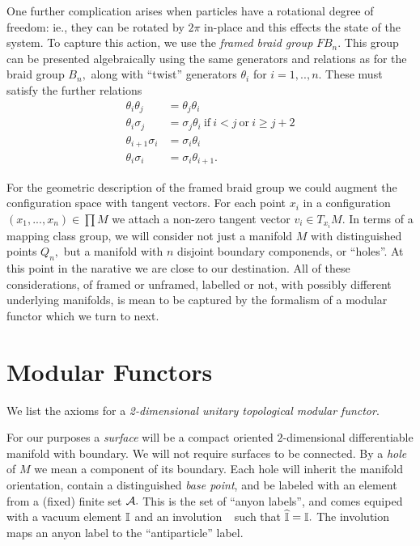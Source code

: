 \documentclass[aps, prl, letterpaper, twocolumn, superscriptaddress, notitlepage, 10pt]{revtex4-1}
\begin{document}
One further complication arises when particles have a rotational
degree of freedom: ie., they can be rotated by $2\pi$ in-place and
this effects the state of the system.
To capture this action, we use the \emph{framed braid group} $FB_n.$
This group can be presented algebraically using the same generators
and relations as for the braid group $B_n,$ along with
``twist'' generators $\theta_i$ for $i=1,..,n.$
These must satisfy the further relations
\begin{align*}
    \theta_i \theta_j &= \theta_j \theta_i \\
    \theta_i\sigma_j &= \sigma_j\theta_i 
    \ \mbox{if}\ i<j \ \mbox{or}\ i\ge j+2\\
    \theta_{i+1}\sigma_i &= \sigma_i\theta_i \\
    \theta_{i}\sigma_i &= \sigma_i\theta_{i+1}.
\end{align*}

For the geometric description of the framed braid
group we could augment the configuration space
with tangent vectors. For each point $x_i$
in a configuration $(x_1,...,x_n)\in \prod M$ we
attach a non-zero tangent vector $v_i\in T_{x_i}M.$
In terms of a mapping class group, we will
consider not just a manifold $M$ with
distinguished points $Q_n,$ but a manifold with $n$ disjoint
boundary componends, or ``holes''.
At this point in the narative we are close to our destination.
All of these considerations, of framed or unframed, labelled or
not, with possibly different underlying manifolds, is mean to
be captured by the formalism of a modular functor which we turn to next.


%
%

\section{Modular Functors}

We list the axioms for a 
\emph{2-dimensional unitary topological modular functor}.

For our purposes a \emph{surface} will be a compact
oriented $2$-dimensional differentiable manifold with boundary. %
We will not require surfaces to be connected.
By a \emph{hole} of $M$ we mean a component of its boundary. %
Each hole will inherit the manifold orientation,
contain a distinguished \emph{base point},
and be labeled with
an element from a (fixed) finite set $\mathcal{A}.$
This is the set of ``anyon labels'', and comes
equiped with a vacuum element $\mathbb{I}$ 
and an involution $\ \widehat{}\ $ such that $\widehat{\mathbb{I}}=\mathbb{I}.$
The involution maps an anyon label to the ``antiparticle'' label.
\end{document}
